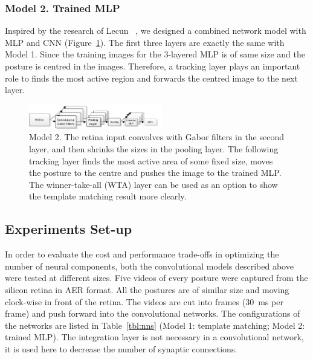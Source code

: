 \documentclass[journal]{journal}
\begin{document}
\subsubsection{Model 2. Trained MLP}
Inspired by the research of Lecun~\cite{lecun1998gradient} , we designed a combined network model with MLP and CNN (Figure~\ref{fig:model2}). 
The first three layers are exactly the same with Model 1.
Since the training images for the 3-layered MLP is of same size and the posture is centred in the images.
Therefore, a tracking layer plays an important role to finds the most active region and forwards the centred image to the next layer. 


\begin{figure}
\centering
	\includegraphics[width=0.52\textwidth]{pics/model2.pdf}
	\caption{Model 2. 
	The retina input convolves with Gabor filters in the second layer, and then shrinks the sizes in the pooling layer.
	The following tracking layer finds the most active area of some fixed size, moves the posture to the centre and pushes the image to the trained MLP.
	The winner-take-all (WTA) layer can be used as an option to show the template matching result more clearly.}
	\label{fig:model2}
\end{figure}


\subsection{Experiments Set-up}
\label{sec:tat}
In order to evaluate the cost and performance trade-offs in optimizing the number of neural components, both the convolutional models described above were tested at different sizes. 
Five videos of every posture were captured from the silicon retina in AER format.  
All the postures are of similar size and moving clock-wise in front of the retina. 
The videos are cut into frames (30~ms per frame) and push forward into the convolutional networks. 
The configurations of the networks are listed in Table~\ref{tbl:nns} (Model 1: template matching; Model 2: trained MLP). 
The integration layer is not necessary in a convolutional network, it is used here to decrease the number of synaptic connections.
\end{document}
